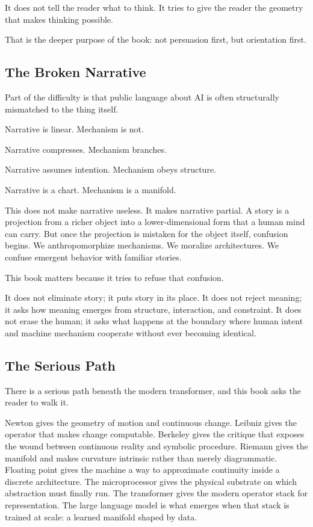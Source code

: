 \documentclass[
]{article}
\begin{document}
It does not tell the reader what to think. It tries to give the reader
the geometry that makes thinking possible.

That is the deeper purpose of the book: not persuasion first, but
orientation first.

\hypertarget{the-broken-narrative}{%
\subsection{The Broken Narrative}\label{the-broken-narrative}}

Part of the difficulty is that public language about AI is often
structurally mismatched to the thing itself.

Narrative is linear. Mechanism is not.

Narrative compresses. Mechanism branches.

Narrative assumes intention. Mechanism obeys structure.

Narrative is a chart. Mechanism is a manifold.

This does not make narrative useless. It makes narrative partial. A
story is a projection from a richer object into a lower-dimensional form
that a human mind can carry. But once the projection is mistaken for the
object itself, confusion begins. We anthropomorphize mechanisms. We
moralize architectures. We confuse emergent behavior with familiar
stories.

This book matters because it tries to refuse that confusion.

It does not eliminate story; it puts story in its place. It does not
reject meaning; it asks how meaning emerges from structure, interaction,
and constraint. It does not erase the human; it asks what happens at the
boundary where human intent and machine mechanism cooperate without ever
becoming identical.

\hypertarget{the-serious-path}{%
\subsection{The Serious Path}\label{the-serious-path}}

There is a serious path beneath the modern transformer, and this book
asks the reader to walk it.

Newton gives the geometry of motion and continuous change. Leibniz gives
the operator that makes change computable. Berkeley gives the critique
that exposes the wound between continuous reality and symbolic
procedure. Riemann gives the manifold and makes curvature intrinsic
rather than merely diagrammatic. Floating point gives the machine a way
to approximate continuity inside a discrete architecture. The
microprocessor gives the physical substrate on which abstraction must
finally run. The transformer gives the modern operator stack for
representation. The large language model is what emerges when that stack
is trained at scale: a learned manifold shaped by data.
\end{document}
